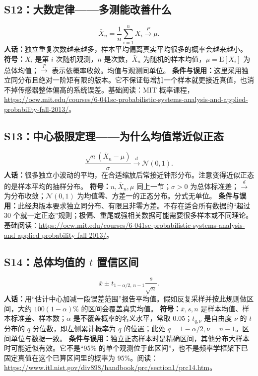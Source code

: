 \subsection{S12：大数定律——多测能改善什么}
\begin{equation}
 \bar X_n=\frac1n\sum_{i=1}^{n}X_i\xrightarrow{P}\mu.
\end{equation}
\textbf{人话：}独立重复次数越来越多，样本平均偏离真实平均很多的概率会越来越小。
\textbf{符号：}$X_i$ 是第 $i$ 次随机观测，$n$ 是次数，$\bar X_n$ 为随机的样本均值，$\mu=\mathrm E[X_i]$ 为总体均值；$\xrightarrow{P}$ 表示依概率收敛。均值与观测同单位。
\textbf{条件与误用：}这里采用独立同分布且绝对一阶矩有限的版本。它不保证每增加一个样本就更接近真值，也消不掉传感器整体偏高的系统误差。基础阅读：MIT 概率课程，\url{https://ocw.mit.edu/courses/6-041sc-probabilistic-systems-analysis-and-applied-probability-fall-2013/}。

\subsection{S13：中心极限定理——为什么均值常近似正态}
\begin{equation}
 \frac{\sqrt n(\bar X_n-\mu)}{\sigma}\xrightarrow{d}\mathcal N(0,1).
\end{equation}
\textbf{人话：}很多独立小波动的平均，在合适缩放后常接近钟形分布。注意变得近似正态的是样本平均的抽样分布。
\textbf{符号：}$n,\bar X_n,\mu$ 同上一节；$\sigma>0$ 为总体标准差；$\xrightarrow d$ 为分布收敛；$\mathcal N(0,1)$ 为均值零、方差一的正态分布。分式无单位。
\textbf{条件与误用：}此经典版本要求独立同分布、有限且非零方差。不存在适合所有数据的“超过 30 个就一定正态”规则；极偏、重尾或强相关数据可能需要很多样本或不同理论。基础阅读：\url{https://ocw.mit.edu/courses/6-041sc-probabilistic-systems-analysis-and-applied-probability-fall-2013/}。

\subsection{S14：总体均值的 $t$ 置信区间}
\begin{equation}
 \bar{x}\pm t_{1-\alpha/2,\,n-1}\frac{s}{\sqrt n}.
\end{equation}
\textbf{人话：}用“估计中心加减一段误差范围”报告平均值。假如反复采样并按此规则做区间，大约 $100(1-\alpha)\%$ 的区间会覆盖真实均值。
\textbf{符号：}$\bar x,s,n$ 是样本均值、样本标准差、样本数；$\alpha$ 是不覆盖概率的名义水平，常取 $0.05$；$t_{q,\nu}$ 是自由度 $\nu$ 的 $t$ 分布的 $q$ 分位数，即左侧累计概率为 $q$ 的位置；此处 $q=1-\alpha/2,\nu=n-1$。区间单位与数据一致。
\textbf{条件与误用：}独立正态样本时是精确区间，其他分布大样本时可能近似有效。它不是“95\% 的单个观测位于此区间”，也不是频率学框架下已固定真值在这个已算区间里的概率为 95\%。阅读：\url{https://www.itl.nist.gov/div898/handbook/prc/section1/prc14.htm}。


